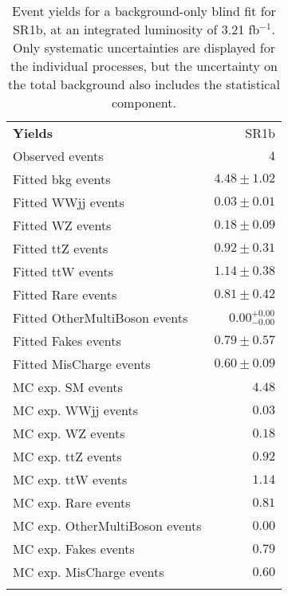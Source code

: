 \begin{table}
\begin{center}
\setlength{\tabcolsep}{0.0pc}
{\small
\begin{tabular*}{\textwidth}{@{\extracolsep{\fill}}lr}
\noalign{\smallskip}\hline\noalign{\smallskip}
{\bf Yields}           & SR1b              \\[-0.05cm]
\noalign{\smallskip}\hline\noalign{\smallskip}
Observed events          & $4$                    \\
\noalign{\smallskip}\hline\noalign{\smallskip}
Fitted bkg events         & $4.48 \pm 1.02$              \\
\noalign{\smallskip}\hline\noalign{\smallskip}
        Fitted WWjj events         & $0.03 \pm 0.01$              \\
        Fitted WZ events         & $0.18 \pm 0.09$              \\
        Fitted ttZ events         & $0.92 \pm 0.31$              \\
        Fitted ttW events         & $1.14 \pm 0.38$              \\
        Fitted Rare events         & $0.81 \pm 0.42$              \\
        Fitted OtherMultiBoson events         & $0.00_{-0.00}^{+0.00}$              \\
        Fitted Fakes events         & $0.79 \pm 0.57$              \\
        Fitted MisCharge events         & $0.60 \pm 0.09$              \\
 \noalign{\smallskip}\hline\noalign{\smallskip}
MC exp. SM events              & $4.48$              \\
\noalign{\smallskip}\hline\noalign{\smallskip}
        MC exp. WWjj events         & $0.03$              \\
        MC exp. WZ events         & $0.18$              \\
        MC exp. ttZ events         & $0.92$              \\
        MC exp. ttW events         & $1.14$              \\
        MC exp. Rare events         & $0.81$              \\
        MC exp. OtherMultiBoson events         & $0.00$              \\
        MC exp. Fakes events         & $0.79$              \\
        MC exp. MisCharge events         & $0.60$              \\
\noalign{\smallskip}\hline\noalign{\smallskip}
\end{tabular*}
}
\end{center}
\caption{Event yields for a background-only blind fit for SR1b, at an integrated luminosity of 3.21 fb$^{-1}$. Only systematic uncertainties are displayed for the individual processes, but the uncertainty on the total background also includes the statistical component.}
\label{tab:histfitter:yields:bgonly:SR1b}

\end{table}



